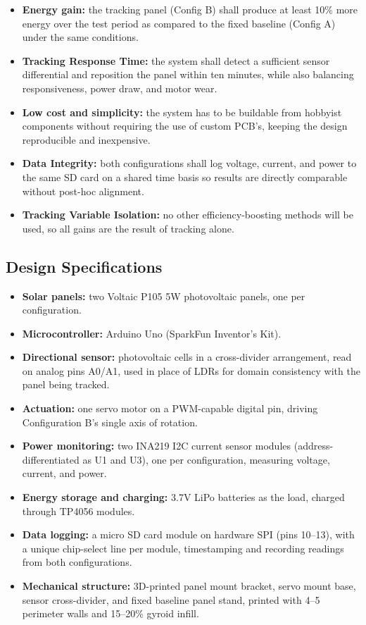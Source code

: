 \documentclass[journal]{IEEEtran}
\begin{document}
\begin{itemize}
  \item \textbf{Energy gain:} the tracking panel (Config B) shall produce at least 10\%
  more energy over the test period as compared to the fixed baseline (Config A) under
  the same conditions.
  \item \textbf{Tracking Response Time:} the system shall detect a sufficient sensor
  differential and reposition the panel within ten minutes, while also balancing
  responsiveness, power draw, and motor wear.
  \item \textbf{Low cost and simplicity:} the system has to be buildable from hobbyist
  components without requiring the use of custom PCB's, keeping the design reproducible
  and inexpensive.
  \item \textbf{Data Integrity:} both configurations shall log voltage, current, and
  power to the same SD card on a shared time basis so results are directly comparable
  without post-hoc alignment.
  \item \textbf{Tracking Variable Isolation:} no other efficiency-boosting methods will
  be used, so all gains are the result of tracking alone.
\end{itemize}

\subsection{Design Specifications}

\begin{itemize}
  \item \textbf{Solar panels:} two Voltaic P105 5W photovoltaic panels, one per
  configuration.
  \item \textbf{Microcontroller:} Arduino Uno (SparkFun Inventor's Kit).
  \item \textbf{Directional sensor:} photovoltaic cells in a cross-divider arrangement,
  read on analog pins A0/A1, used in place of LDRs for domain consistency with the panel
  being tracked.
  \item \textbf{Actuation:} one servo motor on a PWM-capable digital pin, driving
  Configuration B's single axis of rotation.
  \item \textbf{Power monitoring:} two INA219 I2C current sensor modules
  (address-differentiated as U1 and U3), one per configuration, measuring voltage,
  current, and power.
  \item \textbf{Energy storage and charging:} 3.7V LiPo batteries as the load, charged
  through TP4056 modules.
  \item \textbf{Data logging:} a micro SD card module on hardware SPI (pins 10--13),
  with a unique chip-select line per module, timestamping and recording readings from
  both configurations.
  \item \textbf{Mechanical structure:} 3D-printed panel mount bracket, servo mount base,
  sensor cross-divider, and fixed baseline panel stand, printed with 4--5 perimeter
  walls and 15--20\% gyroid infill.
\end{itemize}
\end{document}
